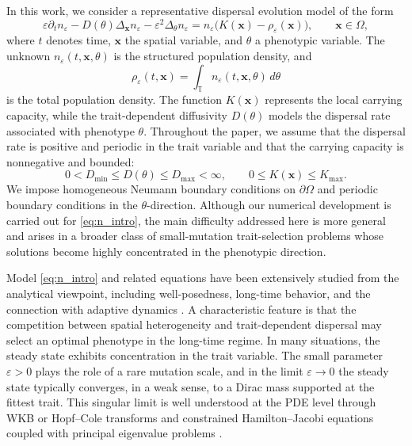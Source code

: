 \documentclass[11pt]{article}
\begin{document}
In this work, we consider a representative dispersal evolution model of the form \cite{BP, Tan}
\begin{equation}\label{eq:n_intro}
    \varepsilon \partial_t n_\varepsilon
    -D(\theta)\Delta_\mathbf{x} n_\varepsilon
    -\varepsilon^2\Delta_\theta n_\varepsilon
    =
    n_\varepsilon\bigl(K(\mathbf{x})-\rho_\varepsilon(\mathbf{x})\bigr),
    \qquad \mathbf{x}\in\Omega,
\end{equation}
where $t$ denotes time, $\mathbf{x}$ the spatial variable, and $\theta$ a phenotypic variable. The unknown $n_\varepsilon(t,\mathbf{x},\theta)$ is the structured population density, and
\[
\rho_\varepsilon(t,\mathbf{x})
=
\int_{\mathbb T} n_\varepsilon(t,\mathbf{x},\theta)\,d\theta
\]
is the total population density. The function $K(\mathbf{x})$ represents the local carrying capacity, while the trait-dependent diffusivity $D(\theta)$ models the dispersal rate associated with phenotype $\theta$. 
Throughout the paper, we assume that the dispersal rate is positive and periodic in the trait variable and that the carrying capacity is nonnegative and bounded:
\begin{equation}\label{eq:basic_assumptions}
    0<D_{\min}\le D(\theta)\le D_{\max}<\infty,
    \qquad
    0\le K(\mathbf{x})\le K_{\max}.
\end{equation}
We impose homogeneous Neumann boundary conditions on $\partial\Omega$ and periodic boundary conditions in the $\theta$-direction. Although our numerical development is carried out for \eqref{eq:n_intro}, the main difficulty addressed here is more general and arises in a broader class of small-mutation trait-selection problems whose solutions become highly concentrated in the phenotypic direction.

Model \eqref{eq:n_intro} and related equations have been extensively studied from the analytical viewpoint, including well-posedness, long-time behavior, and the connection with adaptive dynamics \cite{MirrahimiPerthame,PerthameSouganidis,AlmeidaPerthameRuan}. A characteristic feature is that the competition between spatial heterogeneity and trait-dependent dispersal may select an optimal phenotype in the long-time regime. In many situations, the steady state exhibits concentration in the trait variable. The small parameter $\varepsilon>0$ plays the role of a rare mutation scale, and in the limit $\varepsilon\to0$ the steady state typically converges, in a weak sense, to a Dirac mass supported at the fittest trait. This singular limit is well understood at the PDE level through WKB or Hopf--Cole transforms and constrained Hamilton--Jacobi equations coupled with principal eigenvalue problems \cite{PerthameSouganidis,BarlesPerthame,MirrahimiPerthame}.
\end{document}
